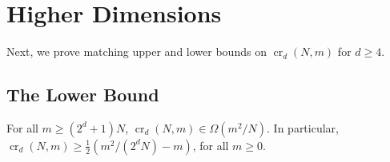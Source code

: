 \documentclass{patmorin}
\newcommand{\n}{N}
\DeclareMathOperator{\crs}{cr}
\begin{document}
\section{Higher Dimensions}

Next, we prove matching upper and lower bounds on $\crs_d(\n,m)$ for
$d\ge 4$.

\subsection{The Lower Bound}

\begin{thm}
  For all $m\ge (2^d+1)\n$, $\crs_d(\n,m)\in\Omega(m^2/\n)$.  In particular,
  $\crs_d(\n,m)\ge \frac{1}{2}(m^2/(2^d\n) - m)$, for all $m\ge 0$.
\end{thm}
\end{document}
